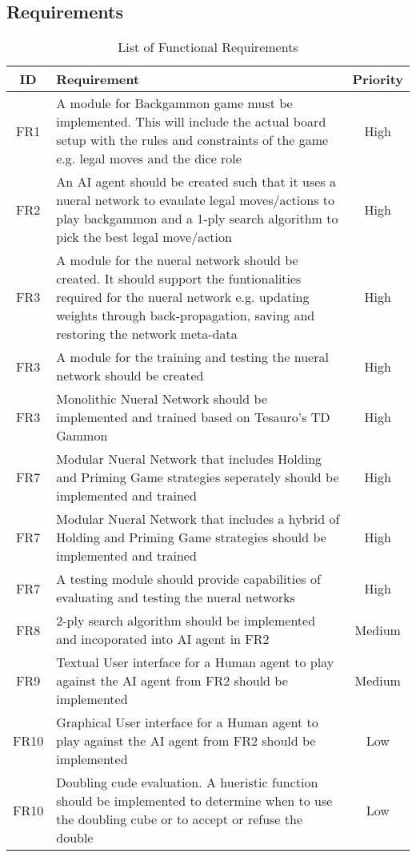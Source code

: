\documentclass[12pt,a4paper]{article}
\begin{document}
\subsection{Requirements}
\begin{table}[htb]
    \centering
    \caption{List of Functional Requirements}
    \vspace*{6pt}
    \label{req}
    \begin{tabular}{cp{12cm}c}
        \hline
        \hline
        ID & Requirement & Priority \\ 
        \hline
        FR1 & A module for Backgammon game must be implemented. This will include the actual board setup with the rules and constraints of the game e.g. legal moves and the dice role & High \\
        \hline
        FR2 & An AI agent should be created such that it uses a nueral network to evaulate legal moves/actions to play backgammon and a 1-ply search algorithm to pick the best legal move/action & High \\
        \hline
        FR3 & A module for the nueral network should be created. It should support the funtionalities required for the nueral network e.g. updating weights through back-propagation, saving and restoring the network meta-data & High \\
        \hline
        FR3 & A module for the training and testing the nueral network should be created & High \\
        \hline
        FR3 & Monolithic Nueral Network should be implemented and trained based on Tesauro's TD Gammon & High \\
        \hline
        FR7 & Modular Nueral Network that includes Holding and Priming Game strategies seperately should be implemented and trained & High \\
        \hline
        FR7 & Modular Nueral Network that includes a hybrid of Holding and Priming Game strategies should be implemented and trained & High \\
        \hline
        FR7 & A testing module should provide capabilities of evaluating and testing the nueral networks & High \\
        \hline
        FR8 & 2-ply search algorithm should be implemented and incoporated into AI agent in FR2 & Medium \\
        \hline
        FR9 & Textual User interface for a Human agent to play against the AI agent from FR2 should be implemented & Medium \\
        \hline
        FR10 & Graphical User interface for a Human agent to play against the AI agent from FR2 should be implemented & Low \\
        \hline
        FR10 & Doubling cude evaluation. A hueristic function should be implemented to determine when to use the doubling cube or to accept or refuse the double & Low \\
        \hline
        
    \end{tabular}
\end{table}
\end{document}
